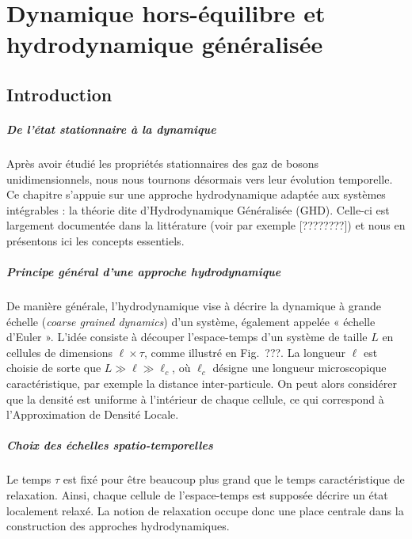 \chapter{Dynamique hors-équilibre et hydrodynamique généralisée}
\label{chap:GHD}
\minitoc


\section*{Introduction}


\paragraph{De l’état stationnaire à la dynamique}  
Après avoir étudié les propriétés stationnaires des gaz de bosons unidimensionnels, nous nous tournons désormais vers leur évolution temporelle. Ce chapitre s’appuie sur une approche hydrodynamique adaptée aux systèmes intégrables : la théorie dite d’Hydrodynamique Généralisée (GHD). Celle-ci est largement documentée dans la littérature (voir par exemple [????????]) et nous en présentons ici les concepts essentiels.

\paragraph{Principe général d’une approche hydrodynamique}  
De manière générale, l’hydrodynamique vise à décrire la dynamique à grande échelle (\emph{coarse grained dynamics}) d’un système, également appelée « échelle d’Euler ». L’idée consiste à découper l’espace-temps d’un système de taille $L$ en cellules de dimensions $\ell \times \tau$, comme illustré en Fig.~???.  
La longueur $\ell$ est choisie de sorte que $L \gg \ell \gg \ell_c$, où $\ell_c$ désigne une longueur microscopique caractéristique, par exemple la distance inter-particule. On peut alors considérer que la densité est uniforme à l’intérieur de chaque cellule, ce qui correspond à l’Approximation de Densité Locale.

\paragraph{Choix des échelles spatio-temporelles}  
Le temps $\tau$ est fixé pour être beaucoup plus grand que le temps caractéristique de relaxation. Ainsi, chaque cellule de l’espace-temps est supposée décrire un état localement relaxé. La notion de relaxation occupe donc une place centrale dans la construction des approches hydrodynamiques.

